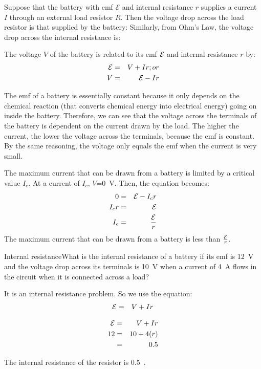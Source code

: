 
Suppose that the battery with emf $\mathcal{E}$ and internal resistance $r$ supplies a current $I$ through an external load resistor $R$. Then the voltage drop across the load resistor is that supplied by the battery:
Similarly, from Ohm's Law, the voltage drop across the internal resistance is: 

The voltage $V$ of the battery is related to its emf ${\cal E}$ and internal resistance $r$ by:
\begin{eqnarray*}
{\cal E} &=& V + I r ;or\\
V&=& {\cal E} - I r
\end{eqnarray*}

The emf of a battery is essentially constant because it only depends on the chemical reaction (that converts chemical energy into electrical energy) going on inside the battery. Therefore, we can see that the voltage across the terminals of the battery is dependent on the current drawn by the load. The higher the current, the lower the voltage across the terminals, because the emf is constant. By the same reasoning, the voltage only equals the emf when the current is very small.

The maximum current that can be drawn from a battery is limited by a critical value $I_c$. At a current of $I_c$, $V$=0~V. Then, the equation becomes:
\begin{eqnarray*}
0 &=& {\cal E} - I_c r\\
I_c r &=& {\cal E}\\
I_c&=&\frac{{\cal E}}{r}
\end{eqnarray*}
The maximum current that can be drawn from a battery is less than $\frac{{\cal E}}{r}$.


\begin{wex}{Internal resistance}{What is the internal resistance of a battery if its emf is 12~V and the voltage drop across its terminals is 10~V when a current of 4~A flows in the circuit when it is connected across a load?}{
It is an internal resistance problem. So we use the equation:
\begin{eqnarray*}
{\cal E} &=& V + I r
\end{eqnarray*}

\begin{eqnarray*}
{\cal E} &=& V + I r\\
12&=&10 + 4(r)\\ 
&=&0.5
\end{eqnarray*}

The internal resistance of the resistor is 0.5~\ohm.}
\end{wex}

